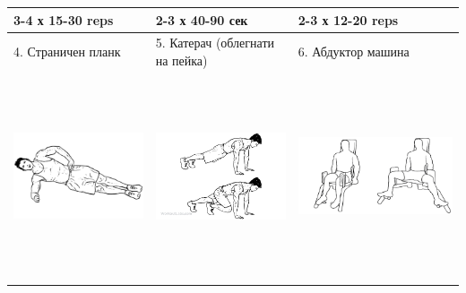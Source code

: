 \documentclass{article}
\begin{document}
\begin{tabular}{ | m{5cm} | m{5cm} | m{5cm} | }
3-4 х 15-30 reps &  2-3 х 40-90 сек &  2-3 х 12-20 reps \\
\hline
4. Страничен планк  & 
5. Катерач (облегнати на пейка) & 
6. Абдуктор машина \\ 
\begin{minipage}{5cm} \includegraphics[width=\linewidth, height=60mm]{day_C_ex_4_Side-Plank.png} \end{minipage} &
\begin{minipage}{5cm} \includegraphics[width=\linewidth, height=60mm]{day_C_ex_5_Mountain_Climbers.png} \end{minipage} & 
\begin{minipage}{5cm} \includegraphics[width=\linewidth, height=60mm]{day_C_ex_6_winner-thigh-abductor.png} \end{minipage} \\

\end{tabular}
\end{document}

